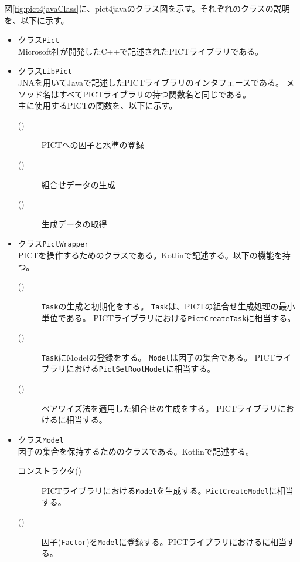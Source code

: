 \documentclass[uplatex, report, a4j, 10pt]{jsbook}
\newcommand\ttt[1]{\texttt{#1}}
\begin{document}
図\ref{fig:pict4javaClass}に、pict4javaのクラス図を示す。それぞれのクラスの説明を、以下に示す。
\begin{itemize}
  \item クラス\ttt{Pict}\\
        Microsoft社が開発したC++で記述されたPICTライブラリである。
  \item クラス\ttt{LibPict}\\
        JNAを用いてJavaで記述したPICTライブラリのインタフェースである。
        メソッド名はすべてPICTライブラリの持つ関数名と同じである。\\
        主に使用するPICTの関数を、以下に示す。
        \begin{description}
          \item[\PictAddParameter{}()] PICTへの因子と水準の登録
          \item[\PictGenerate{}()] 組合せデータの生成
          \item[\PictGetNextResultRow{}()] 生成データの取得
        \end{description}
  \item クラス\ttt{PictWrapper}\\
        PICTを操作するためのクラスである。Kotlin\cite{kotlin}で記述する。以下の機能を持つ。
        \begin{description}
          \item[\createTask{}()] \ttt{Task}の生成と初期化をする。
                \ttt{Task}は、PICTの組合せ生成処理の最小単位である。
                PICTライブラリにおける\ttt{PictCreateTask}に相当する。
          \item[\setRootModel{}()] \ttt{Task}にModelの登録をする。
                \ttt{Model}は因子の集合である。
                PICTライブラリにおける\ttt{PictSetRootModel}に相当する。
          \item[\generate{}()] ペアワイズ法を適用した組合せの生成をする。
                PICTライブラリにおける\PictGenerate{}に相当する。
        \end{description}
  \item クラス\ttt{Model}\\
        因子の集合を保持するためのクラスである。Kotlinで記述する。
        \begin{description}
          \item[コンストラクタ()] PICTライブラリにおける\ttt{Model}を生成する。\ttt{PictCreateModel}に相当する。
          \item[\addFactor{}()] 因子(\ttt{Factor})を\ttt{Model}に登録する。PICTライブラリにおける\PictAddParameter{}に相当する。

\end{description}
\end{itemize}
\end{document}

